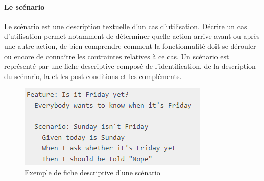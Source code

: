         \paragraph{Le scénario}

        Le scénario est une description textuelle d'un cas d'utilisation. Décrire un cas d'utilisation permet notamment de déterminer quelle action arrive avant ou après une autre action, de bien comprendre comment la fonctionnalité doit se dérouler ou encore de connaître les contraintes relatives à ce cas. Un scénario est représenté par une fiche descriptive composé de l'identification, de la description du scénario, la et les post-conditions et les compléments. 
            \begin{figure}[H]
                \centering
                \includegraphics[width=\textwidth]{scenar.png}
                \caption{Exemple de fiche descriptive d'une scénario}
            \end{figure}
        
